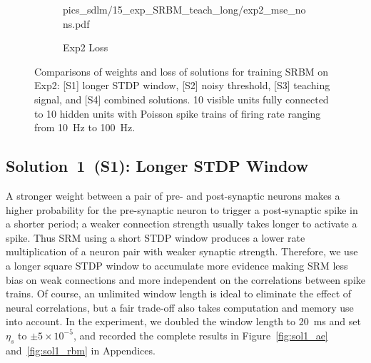 \begin{figure}
\begin{subfigure}[c]{0.45\textwidth}
{			{pics_sdlm/15_exp_SRBM_teach_long/exp2_mse_nons.pdf}}\\
		\caption{Exp2 Loss}
	\end{subfigure}%
	\caption{Comparisons of weights and loss of solutions for training SRBM on Exp2: [S1] longer STDP window, [S2] noisy threshold, [S3] teaching signal, and [S4] combined solutions. 10 visible units fully connected to 10 hidden units with Poisson spike trains of firing rate ranging from 10~Hz to 100~Hz.}
	\label{fig:sols_rbm}
\end{figure}

\subsection{Solution~1~(S1): Longer STDP Window}
A stronger weight between a pair of pre- and post-synaptic neurons makes a higher probability for the pre-synaptic neuron to trigger a post-synaptic spike in a shorter period; 
a weaker connection strength usually takes longer to activate a spike.
Thus SRM using a short STDP window produces a lower rate multiplication of a neuron pair with weaker synaptic strength.
Therefore, we use a longer square STDP window to accumulate more evidence making SRM less bias on weak connections and more independent on the correlations between spike trains.
Of course, an unlimited window length is ideal to eliminate the effect of neural correlations, but a fair trade-off also takes computation and memory use into account.
In the experiment, we doubled the window length to 20~ms and set $\eta_s$ to $\pm 5 \times 10^{-5}$, and recorded the complete results in Figure~\ref{fig:sol1_ae} and~\ref{fig:sol1_rbm} in Appendices.

